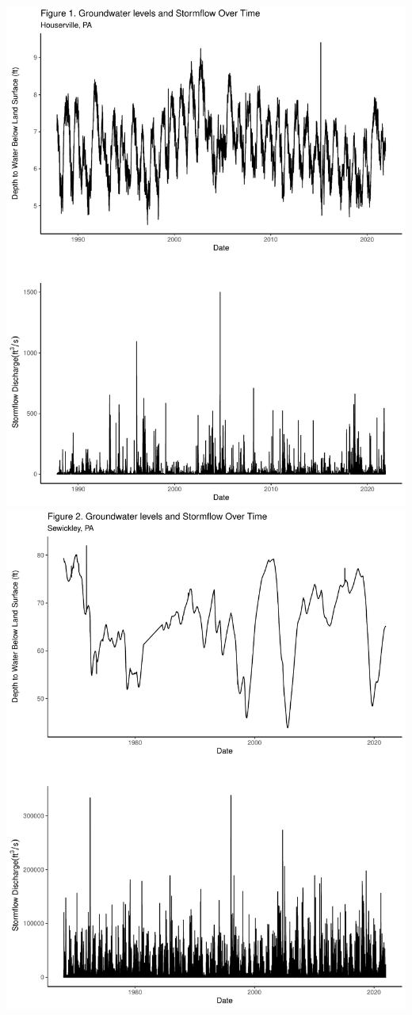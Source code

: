 \documentclass[
  12pt,
]{article}
\begin{document}
\includegraphics{Elliott_WDA_Project_files/figure-latex/explore-1.pdf}
\includegraphics{Elliott_WDA_Project_files/figure-latex/explore-2.pdf}
\end{document}
